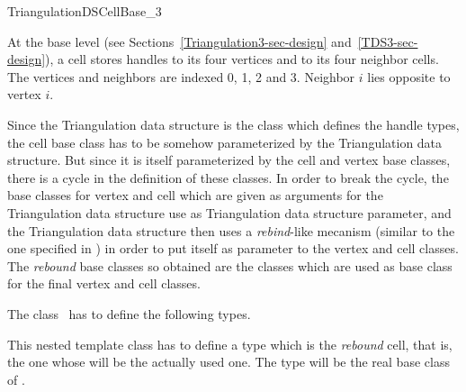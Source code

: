 

\begin{ccRefConcept}{TriangulationDSCellBase_3}


\ccDefinition
  
At the base level 
(see Sections~\ref{Triangulation3-sec-design} and~\ref{TDS3-sec-design}),
a cell stores handles to its four vertices and to its four neighbor cells. 
The vertices and neighbors are indexed 0, 1, 2 and 3. Neighbor $i$
lies opposite to vertex $i$.

Since the Triangulation data structure is the class which defines the handle
types, the cell base class has to be somehow parameterized by the Triangulation
data structure.  But since it is itself parameterized by the cell and vertex
base classes, there is a cycle in the definition of these classes.  In order
to break the cycle, the base classes for vertex and cell which are given as
arguments for the Triangulation data structure use  as Triangulation
data structure parameter, and the Triangulation data structure then uses a
{\it rebind}-like mecanism (similar to the one specified in
) in order to put itself as parameter to the vertex and
cell classes.  The {\it rebound} base classes so obtained are the classes
which are used as base class for the final vertex and cell classes.

\ccTypes
{}
\ccThreeToTwo
The class \ccRefName\ has to define the following types.

{This nested template class has to define a type  which is the
{\it rebound} cell, that is, the one whose 
will be the actually used one.  The  type will be the real base
class of .}


\end{ccRefConcept}
